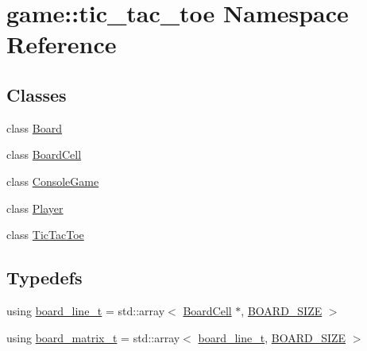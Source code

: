 \hypertarget{namespacegame_1_1tic__tac__toe}{}\section{game\+:\+:tic\+\_\+tac\+\_\+toe Namespace Reference}
\label{namespacegame_1_1tic__tac__toe}
\subsection*{Classes}
\begin{DoxyCompactItemize}
\item 
class \hyperlink{classgame_1_1tic__tac__toe_1_1_board}{Board}
\item 
class \hyperlink{classgame_1_1tic__tac__toe_1_1_board_cell}{Board\+Cell}
\item 
class \hyperlink{classgame_1_1tic__tac__toe_1_1_console_game}{Console\+Game}
\item 
class \hyperlink{classgame_1_1tic__tac__toe_1_1_player}{Player}
\item 
class \hyperlink{classgame_1_1tic__tac__toe_1_1_tic_tac_toe}{Tic\+Tac\+Toe}
\end{DoxyCompactItemize}
\subsection*{Typedefs}
\begin{DoxyCompactItemize}
\item 
using \hyperlink{namespacegame_1_1tic__tac__toe_a3959bb4b3346bd3cdbf5ae9a5c58cacb}{board\+\_\+line\+\_\+t} = std\+::array$<$ \hyperlink{classgame_1_1tic__tac__toe_1_1_board_cell}{Board\+Cell} $\ast$, \hyperlink{tic__tac__toe_2_board_8hpp_a1db39eb31d1315ce982608fe25587b6d}{B\+O\+A\+R\+D\+\_\+\+S\+I\+ZE} $>$
\item 
using \hyperlink{namespacegame_1_1tic__tac__toe_a58fc706fe9ae58c6e9045f6927230232}{board\+\_\+matrix\+\_\+t} = std\+::array$<$ \hyperlink{namespacegame_1_1tic__tac__toe_a3959bb4b3346bd3cdbf5ae9a5c58cacb}{board\+\_\+line\+\_\+t}, \hyperlink{tic__tac__toe_2_board_8hpp_a1db39eb31d1315ce982608fe25587b6d}{B\+O\+A\+R\+D\+\_\+\+S\+I\+ZE} $>$
\end{DoxyCompactItemize}
